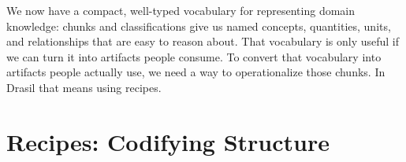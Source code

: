 

We now have a compact, well-typed vocabulary for representing domain knowledge: 
chunks and classifications give us named concepts, quantities, units, and 
relationships that are easy to reason about. That vocabulary is only useful if 
we can turn it into artifacts people consume. To convert that vocabulary into 
artifacts people actually use, we need a way to operationalize those chunks. In 
Drasil that means using recipes.

\section{Recipes: Codifying Structure}
\label{sec:recipes}

